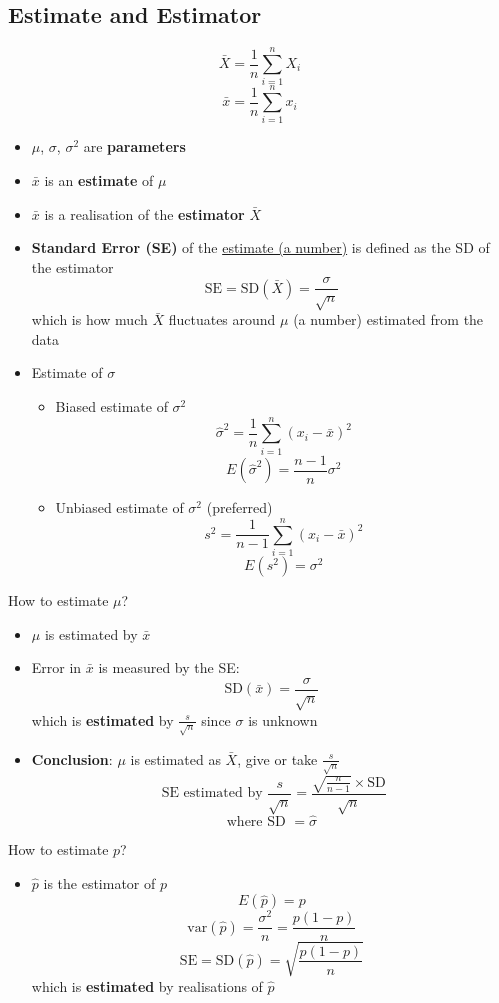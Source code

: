 \documentclass{article}
\begin{document}
\begin{multicols}{2}
\subsection{Estimate and Estimator}
$$\bar{X} = \frac{1}{n}\sum_{i=1}^{n}X_i$$
$$\bar{x} = \frac{1}{n}\sum_{i=1}^{n}x_i$$
\begin{itemize}
	\item $\mu$, $\sigma$, $\sigma^2$ are \textbf{parameters}
	\item $\bar{x}$ is an \textbf{estimate} of $\mu$
	\item $\bar{x}$ is a realisation of the \textbf{estimator} $\bar{X}$
	\item \textbf{Standard Error (SE)} of the \underline{estimate (a number)} is defined as the SD of the estimator
	$$\text{SE} = \text{SD}(\bar{X}) = \frac{\sigma}{\sqrt{n}}$$
	which is how much $\bar{X}$ fluctuates around $\mu$ (a number) estimated from the data
	\item Estimate of $\sigma$
	\begin{itemize}
		\item Biased estimate of $\sigma^2$
		$$\hat{\sigma}^2 = \frac{1}{n}\sum_{i=1}^{n}(x_i-\bar{x})^2$$
		$$E(\hat{\sigma}^2) = \frac{n-1}{n}\sigma^2$$
		\item Unbiased estimate of $\sigma^2$ (preferred)
		$$s^2 = \frac{1}{n-1}\sum_{i=1}^{n}(x_i-\bar{x})^2$$
		$$E(s^2) = \sigma^2$$
	\end{itemize}

\end{itemize}
How to estimate $\mu$?
\begin{itemize}
	\item $\mu$ is estimated by $\bar{x}$
	\item Error in $\bar{x}$ is measured by the SE: $$\text{SD}(\bar{x})=\frac{\sigma}{\sqrt{n}}$$ which is \textbf{estimated} by $\frac{s}{\sqrt{n}}$ since $\sigma$ is unknown
	\item \textbf{Conclusion}: $\mu$ is estimated as $\bar{X}$, give or take $\frac{s}{\sqrt{n}}$
	$$ \text{ SE estimated by } \frac{s}{\sqrt{n}} = \frac{\sqrt{\frac{n}{n-1}}\times \text{SD} }{\sqrt{n}}$$
	$$\text{where SD } = \hat{\sigma}$$
\end{itemize}
How to estimate $p$?
\begin{itemize}
	\item $\hat{p}$ is the estimator of $p$
	$$E(\hat{p}) = p$$
	$$\text{var}(\hat{p}) = \frac{\sigma^2}{n} = \frac{p(1-p)}{n}$$
	$$\text{SE} = \text{SD}(\hat{p}) = \sqrt{\frac{p(1-p)}{n}}$$
	which is \textbf{estimated }by realisations of $\hat{p}$
\end{itemize}

\end{multicols}
\end{document}
